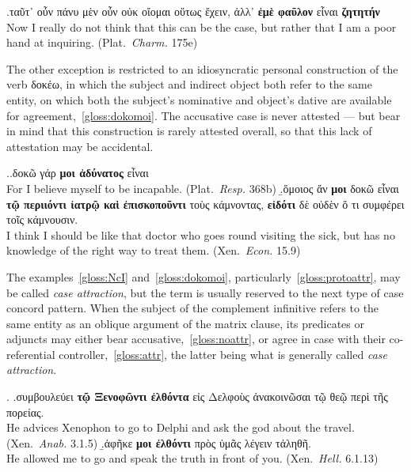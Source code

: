 \documentclass[a4paper, 12pt, article]{memoir}
\begin{document}
\ex.\label{gloss:eme}ταῦτ᾽ οὖν πάνυ μὲν οὖν οὐκ οἴομαι οὕτως ἔχειν, ἀλλ᾽
\textbf{ἐμὲ φαῦλον} εἶναι \textbf{ζητητήν}\\
Now I really do not think that this can be the case, but rather that I am a
poor hand at inquiring. (Plat.\ \emph{Charm.} 175e)


The other exception is restricted to an idiosyncratic personal construction of
the verb δοκέω, in which the subject and indirect object both refer to the same
entity, on which both the subject's nominative and object's dative are available
for agreement,~\ref{gloss:dokomoi}.
The accusative case is never attested --- but bear in mind that this
construction is rarely attested overall, so that this lack of attestation may be
accidental.

\ex.\label{gloss:dokomoi}\a.δοκῶ γάρ \textbf{μοι ἀδύνατος} εἶναι\\
For I believe myself to be incapable. (Plat.\ \emph{Resp.} 368b)
\b.\label{gloss:protoattr}ὅμοιος ἄν \textbf{μοι} δοκῶ εἶναι \textbf{τῷ περιιόντι
	ἰατρῷ καὶ ἐπισκοποῦντι} τοὺς κάμνοντας, \textbf{εἰδότι} δὲ οὐδὲν ὅ τι συμφέρει
τοῖς κάμνουσιν.\\
I think I should be like that doctor who goes round visiting the sick, but has
no knowledge of the right way to treat them. (Xen.\ \emph{Econ.} 15.9)


The examples~\ref{gloss:NcI} and~\ref{gloss:dokomoi},
particularly~\ref{gloss:protoattr}, may be called \emph{case attraction}, but
the term is usually reserved to the next type of case concord pattern.
When the subject of the complement infinitive refers to the same entity as an
oblique argument of the matrix clause, its predicates or adjuncts may either
bear accusative,~\ref{gloss:noattr}, or agree in case with their
co\hyp{}referential controller,~\ref{gloss:attr}, the latter being what is
generally called \emph{case attraction}.


\ex.
\a.\label{gloss:noattr}συμβουλεύει \textbf{τῷ Ξενοφῶντι ἐλθόντα} {εἰς Δελφοὺς}
ἀνακοινῶσαι {τῷ θεῷ} {περὶ τῆς πορείας}.\\
He advices Xenophon to go to Delphi and ask the god about the travel.
(Xen.\ \emph{Anab.} 3.1.5)
\b.\label{gloss:attr}ἀφῆκε \textbf{μοι ἐλθόντι} {πρὸς ὑμᾶς} λέγειν τἀληθῆ.\\
He allowed me to go and speak the truth in front of you.
(Xen.\ \emph{Hell.} 6.1.13)
\end{document}
